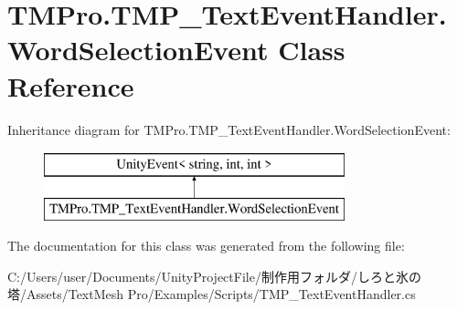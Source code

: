 \hypertarget{class_t_m_pro_1_1_t_m_p___text_event_handler_1_1_word_selection_event}{}\section{T\+M\+Pro.\+T\+M\+P\+\_\+\+Text\+Event\+Handler.\+Word\+Selection\+Event Class Reference}
\label{class_t_m_pro_1_1_t_m_p___text_event_handler_1_1_word_selection_event}
Inheritance diagram for T\+M\+Pro.\+T\+M\+P\+\_\+\+Text\+Event\+Handler.\+Word\+Selection\+Event\+:\begin{figure}[H]
\begin{center}
\leavevmode
\includegraphics[height=2.000000cm]{class_t_m_pro_1_1_t_m_p___text_event_handler_1_1_word_selection_event}
\end{center}
\end{figure}


The documentation for this class was generated from the following file\+:\begin{DoxyCompactItemize}
\item 
C\+:/\+Users/user/\+Documents/\+Unity\+Project\+File/制作用フォルダ/しろと氷の塔/\+Assets/\+Text\+Mesh Pro/\+Examples/\+Scripts/T\+M\+P\+\_\+\+Text\+Event\+Handler.\+cs\end{DoxyCompactItemize}

